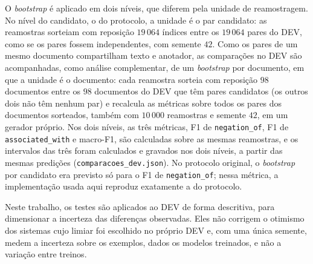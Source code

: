 O \emph{bootstrap} é aplicado em dois níveis, que diferem pela unidade de
reamostragem. No nível do candidato, o do protocolo, a unidade é o par candidato: as
reamostras sorteiam com reposição $19\,064$ índices entre os $19\,064$ pares do DEV,
como se os pares fossem independentes, com semente $42$. Como os pares de um mesmo
documento compartilham texto e anotador, as comparações no DEV são acompanhadas, como
análise complementar, de um \emph{bootstrap} por documento, em que a unidade é o
documento: cada reamostra sorteia com reposição $98$ documentos entre os $98$
documentos do DEV que têm pares candidatos (os outros dois não têm nenhum par) e
recalcula as métricas sobre todos os pares dos documentos sorteados, também com
$10\,000$ reamostras e semente $42$, em um gerador próprio. Nos dois níveis, as três
métricas, F1 de \texttt{negation\_of}, F1 de \texttt{associated\_with} e
macro-F1, são calculadas sobre as mesmas reamostras, e os intervalos das três foram
calculados e gravados nos dois níveis, a partir das mesmas predições
(\texttt{comparacoes\_dev.json}). No protocolo original, o \emph{bootstrap} por
candidato era previsto só para o F1 de \texttt{negation\_of}; nessa métrica, a
implementação usada aqui reproduz exatamente a do protocolo.

Neste trabalho, os testes são aplicados ao DEV de forma descritiva, para dimensionar
a incerteza das diferenças observadas. Eles não corrigem o otimismo dos sistemas
cujo limiar foi escolhido no próprio DEV e, com uma única semente, medem a incerteza
sobre os exemplos, dados os modelos treinados, e não a variação entre treinos.
